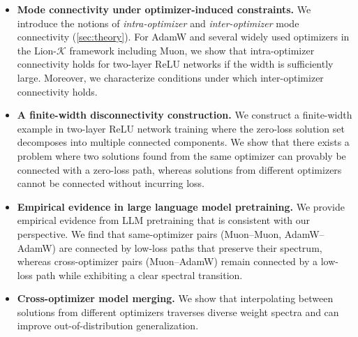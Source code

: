 \documentclass{article}
\begin{document}
\begin{itemize}[left=0pt]
    \item \textbf{Mode connectivity under optimizer-induced constraints.}
    We introduce the notions of \emph{intra-optimizer} and \emph{inter-optimizer} mode connectivity (\cref{sec:theory}). For AdamW and several widely used optimizers in the Lion-$\mathcal{K}$ framework including Muon, we show that intra-optimizer connectivity holds for two-layer ReLU networks if the width is sufficiently large. Moreover, we characterize conditions under which inter-optimizer connectivity holds.

    \item \textbf{A finite-width disconnectivity construction.}
    We construct a finite-width example in two-layer ReLU network training where the zero-loss solution set decomposes into multiple connected components. We show that there exists a problem where two solutions found from the same optimizer can provably be connected with a zero-loss path, whereas solutions from different optimizers cannot be connected without incurring loss.
    \item \textbf{Empirical evidence in large language model pretraining.}
    We provide empirical evidence from LLM pretraining that is consistent with our perspective. We find that same-optimizer pairs (Muon–Muon, AdamW–AdamW) are connected by low-loss paths that preserve their spectrum, whereas cross-optimizer pairs (Muon–AdamW) remain connected by a low-loss path while exhibiting a clear spectral transition.
    \item \textbf{Cross-optimizer model merging.} We show that interpolating between solutions from different optimizers traverses diverse weight spectra and can improve out-of-distribution generalization.
\end{itemize}

\end{document}

